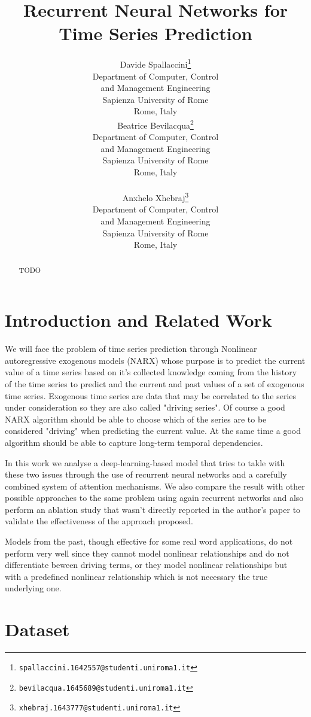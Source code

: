 \documentclass{article}
\title{Recurrent Neural Networks for Time Series Prediction}
\author{
  Davide Spallaccini\thanks{\texttt{spallaccini.1642557@studenti.uniroma1.it}}
\\
  Department of Computer, Control \\ and Management Engineering\\
  Sapienza University of Rome\\
  Rome, Italy \\
  \And
  Beatrice Bevilacqua\thanks{\texttt{bevilacqua.1645689@studenti.uniroma1.it}}
\\
  Department of Computer, Control \\ and Management Engineering\\
  Sapienza University of Rome\\
  Rome, Italy \\
   \\
  \And
  Anxhelo Xhebraj\thanks{\texttt{xhebraj.1643777@studenti.uniroma1.it}} \\
  Department of Computer, Control \\ and Management Engineering\\
  Sapienza University of Rome\\
  Rome, Italy
}
\begin{document}

\maketitle

\begin{abstract}

TODO

\end{abstract}

\section{Introduction and Related Work}
\label{sec:intro}

We will face the problem of time series prediction through Nonlinear
autoregressive exogenous models (NARX) whose
purpose is to predict the current value of a time series based on it's
collected knowledge coming from the history of
the time series to predict and the current and past values of a set of
exogenous time series. Exogenous time series
are data that may be correlated to the series under consideration so they are
also called "driving series". Of course
a good NARX algorithm should be able to choose which of the series are to be
considered "driving" when predicting the
current value. At the same time a good algorithm should be able to capture
long-term temporal dependencies.

In this work we analyse a deep-learning-based model that tries to takle with
these two issues through the use of
recurrent neural networks and a carefully combined system of attention
mechanisms. We also compare the result with
other possible approaches to the same problem using again recurrent networks
and also perform an ablation study that
wasn't directly reported in the author's paper to validate the effectiveness of
the approach proposed.

Models from the past, though effective for some real word applications, do not
perform very well since they cannot
model nonlinear relationships and do not differentiate beween driving terms, or
they model nonlinear relationships
but with a predefined nonlinear relationship which is not necessary the true
underlying one.

\section{Dataset}
\label{sec:retrieval}
\end{document}
